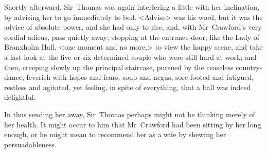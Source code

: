 Shortly afterward, Sir~Thomas was again interfering a little with her inclination, by advising her to go immediately to bed. <Advise> was his word, but it was the advice of absolute power, and she had only to rise, and, with Mr~Crawford's very cordial adieus, pass quietly away; stopping at the entrance-door, like the Lady of Branxholm Hall, <one moment and no more,> to view the happy scene, and take a last look at the five or six determined couple who were still hard at work; and then, creeping slowly up the principal staircase, pursued by the ceaseless country-dance, feverish with hopes and fears, soup and negus, sore-footed and fatigued, restless and agitated, yet feeling, in spite of everything, that a ball was indeed delightful.

In thus sending her away, Sir~Thomas perhaps might not be thinking merely of her health. It might occur to him that Mr~Crawford had been sitting by her long enough, or he might mean to recommend her as a wife by shewing her persuadableness. 